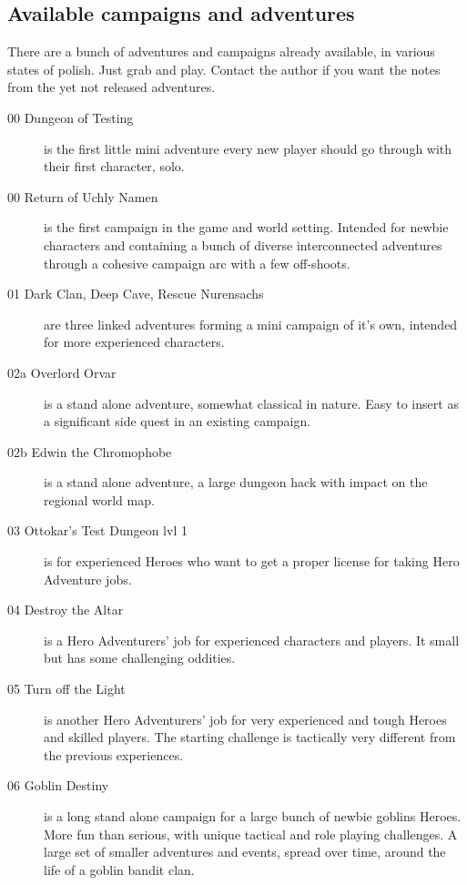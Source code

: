 \subsection*{Available campaigns and adventures}
There are a bunch of adventures and campaigns already available, in various states of polish. Just grab and play. Contact the author if you want the notes from the yet not released adventures.

\begin{description}
    \item[00 Dungeon of Testing] is the first little mini adventure every new player should go through with their first character, solo.
    \item[00 Return of Uchly Namen] is the first campaign in the game and world setting. Intended for newbie characters and containing a bunch of diverse interconnected adventures through a cohesive campaign arc with a few off-shoots.
    \item[01 Dark Clan, Deep Cave, Rescue Nurensachs] are three linked adventures forming a mini campaign of it's own, intended for more experienced characters.
    \item[02a Overlord Orvar] is a stand alone adventure, somewhat classical in nature. Easy to insert as a significant side quest in an existing campaign.
    \item[02b Edwin the Chromophobe] is a stand alone adventure, a large dungeon hack with impact on the regional world map. 
    \item[03 Ottokar's Test Dungeon lvl 1] is for experienced Heroes who want to get a proper license for taking Hero Adventure jobs.
    \item[04 Destroy the Altar] is a Hero Adventurers' job for experienced characters and players. It small but has some challenging oddities.
    \item[05 Turn off the Light] is another Hero Adventurers' job for very experienced and tough Heroes and skilled players. The starting challenge is tactically very different from the previous experiences.
    \item[06 Goblin Destiny] is a long stand alone campaign for a large bunch of newbie goblins Heroes. More fun than serious, with unique tactical and role playing challenges. A large set of smaller adventures and events, spread over time, around the life of a goblin bandit clan.
\end{description}


